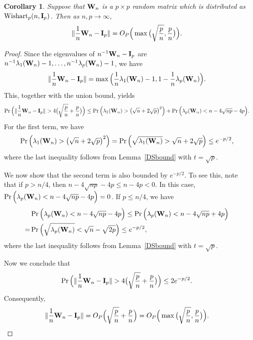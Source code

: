 \documentclass[review]{elsarticle}
\theoremstyle{plain}
\newtheorem{corollary}{\quad\quad Corollary}
\theoremstyle{definition}
\theoremstyle{remark}
\begin{document}
\begin{appendices}
\begin{corollary}\label{corNorm}
Suppose that $\mathbf{W}_n$ is a $p \times p$ random matrix which is distributed as $\mathrm{Wishart}_p(n,\mathbf{I}_{p})$.
    Then as $n,p\to \infty$,
$$
    \|\frac{1}{n}\mathbf{W}_n-\mathbf{I}_p\|=O_P\Big(\max\big(\sqrt{\frac{p}{n}},\frac{p}{n}\big)\Big).
$$
\end{corollary}
\begin{proof}
    Since the eigenvalues of $n^{-1}\mathbf{W}_n-\mathbf{I}_p$ are $n^{-1}\lambda_1(\mathbf{W}_n)-1,\ldots, n^{-1}\lambda_p(\mathbf{W}_n)-1$, we have
     $$\|\frac{1}{n}\mathbf{W}_n-\mathbf{I}_p\|=\max\Big(\frac{1}{n}\lambda_1(\mathbf{W}_n)-1,1-\frac{1}{n}\lambda_p(\mathbf{W}_n)\Big).$$
This, together with the union bound, yields
$$
    \Pr\Big(\|\frac{1}{n}\BW_n-\BI_p\|>4\big(\sqrt{\frac{p}{n}}+\frac{p}{n}\big)\Big)
    \leq
    \Pr\Big(\lambda_1(\BW_n)>\big(\sqrt{n}+2\sqrt{p}\big)^2\Big)+
    \Pr\Big(\lambda_p(\BW_n)<n-4\sqrt{np}-4p\Big).
$$
    For the first term, we have    $$
    \Pr\Big(\lambda_1(\mathbf{W}_n)>\big(\sqrt{n}+2\sqrt{p}\big)^2\Big)=
    \Pr\Big(\sqrt{\lambda_1(\mathbf{W}_n)}>\sqrt{n}+2\sqrt{p}\Big)\leq e^{-p/2},
    $$
 where the last inequality follows from Lemma~\ref{DSbound} with $t=\sqrt{p}$.

    We now show that the second term is also bounded by $e^{-p/2}$.
    To see this, note that if $p>n/4$, then $n-4\sqrt{np}-4p\leq n-4p<0$.
    In this case, $\Pr\Big(\lambda_p(\mathbf{W}_n)<n-4\sqrt{np}-4p\Big)=0$.
    If $p\leq n/4$, we have
    $$
    \begin{aligned}
        &\Pr\Big(\lambda_p(\mathbf{W}_n)<n-4\sqrt{np}-4p\Big)
    \leq
    \Pr\Big(\lambda_p(\mathbf{W}_n)<n-4\sqrt{np}+4p\Big)\\
        =&
    \Pr\Big(\sqrt{\lambda_p(\mathbf{W}_n)}<\sqrt{n}-\sqrt{2p}\Big)
        \leq e^{-p/2},
    \end{aligned}
    $$
    where the last inequality follows from Lemma~\ref{DSbound} with $t=\sqrt{p}$.

    Now we conclude that
    $$
    \Pr\Big(\|\frac{1}{n}\BW_n-\BI_p\|>4\big(\sqrt{\frac{p}{n}}+\frac{p}{n}\big)\Big)
    \leq 2 e^{-p/2}.
    $$
    Consequently,
    $$\|\frac{1}{n}\mathbf{W}_n-\mathbf{I}_p\|=O_P\Big(\sqrt{\frac{p}{n}}+\frac{p}{n}\Big)=O_P\Big(\max\big(\sqrt{\frac{p}{n}},\frac{p}{n}\big)\Big).$$
\end{proof}




\end{appendices}
\end{document}
